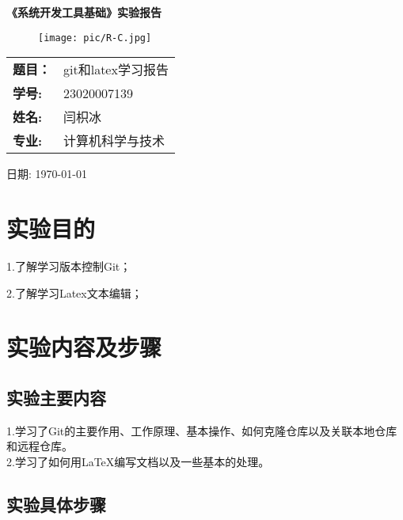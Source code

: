 \documentclass[a4paper]{article}
\begin{document}
 

\begin{titlepage}  
    \centering  
    \huge \textbf{《系统开发工具基础》实验报告} \\  
      \vspace{5cm}  
    
     \begin{figure}[ht]
    \centering
    \texttt{[image: pic/R-C.jpg]}
\end{figure}
 \vspace{3cm} 
 
    \Large  
    \begin{tabular}{ll} 
        \textbf{题目：}&git和latex学习报告\\
        \cline{2-2} 
        \textbf{学号:} & 23020007139 \\ 
       \cline{2-2} 
        \textbf{姓名:} & 闫枳冰 \\  
        \cline{2-2} 
        \textbf{专业:} & 计算机科学与技术 \\  
       \cline{2-2} 
    \end{tabular}  
    \vspace{2cm}  
 
    \Large 日期: \today  
    
\end{titlepage}  
  
\tableofcontents
\newpage
{}

\section{实验目的}  
1.了解学习版本控制Git；

2.了解学习Latex文本编辑；
\section{实验内容及步骤}
\subsection{实验主要内容}
1.学习了Git的主要作用、工作原理、基本操作、如何克隆仓库以及关联本地仓库和远程仓库。\\

2.学习了如何用LaTeX编写文档以及一些基本的处理。
\subsection{实验具体步骤}
\end{document}
